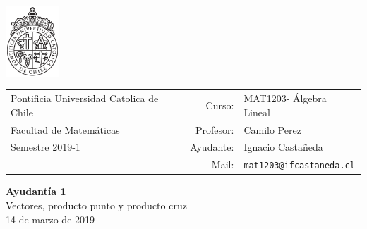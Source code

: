 \documentclass[12pt]{article}
\makeatletter
\newcommand{\ayudantia}{{\sc Ayudantía 1}}
\newcommand{\tituloayu}{Vectores, producto punto y producto cruz}
\newcommand{\fecha}{14 de marzo de 2019}
\newcommand{\sigla}{MAT1203}
\newcommand{\nombre}{Álgebra Lineal}
\newcommand{\profesor}{Camilo Perez}
\newcommand{\ano}{2019}
\newcommand{\semestre}{1}
\newcommand{\mail}{mat1203@ifcastaneda.cl}
\makeatother
\begin{document}
\thispagestyle{empty}

\begin{minipage}{2cm}
	\includegraphics[width=2cm]{../../../../img/logo.pdf}
	\vspace{0.5cm}
\end{minipage}
\begin{minipage}{\linewidth}
	\begin{tabular}{lrl}
		{\scriptsize\sc Pontificia Universidad Catolica de Chile} & \hspace*{0.7in}Curso: &
		\sigla  - \nombre\\
		{\sc Facultad de Matemáticas}&
		Profesor: & \profesor \\
		{\sc Semestre \ano-\semestre} & Ayudante: & {Ignacio Castañeda}\\
		& {Mail:} & \texttt{\mail}
	\end{tabular}
\end{minipage}

\vspace{-10mm}
\begin{center}
	{\LARGE\bf \ayudantia}\\
	\vspace{0.1cm}
	{\tituloayu}\\
	\vspace{0.1cm}
	\fecha\\
	\vspace{0.4cm}
\end{center}
\end{document}
